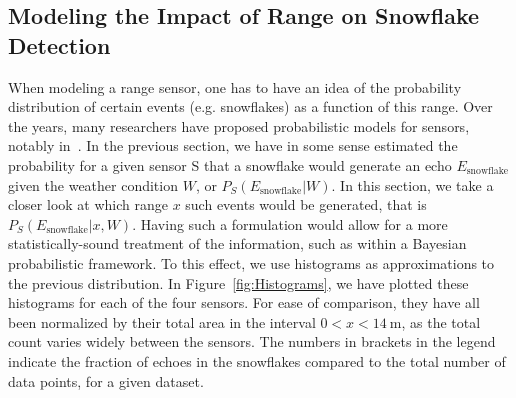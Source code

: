\subsection{Modeling the Impact of Range on Snowflake Detection}
When modeling a range sensor, one has to have an idea of the probability distribution of certain events (e.g. snowflakes) as a function of this range. Over the years, many researchers have proposed probabilistic models for sensors, notably in~\cite{Thrun:2005:PR:1121596}. In the previous section, we have in some sense estimated the probability for a given sensor S that a snowflake would generate an echo $E_\text{snowflake}$ given the weather condition $W$, or $P_S(E_\text{snowflake}|W)$. In this section, we take a closer look at which range $x$ such events would be generated, that is $P_S(E_\text{snowflake}|x,W)$. Having such a formulation would allow for a more statistically-sound treatment of the information, such as within a Bayesian probabilistic framework. To this effect, we use histograms as approximations to the previous distribution. In Figure~\ref{fig:Histograms}, we have plotted these histograms for each of the four sensors. For ease of comparison, they have all been normalized by their total area in the interval $0 < x < \SI{14}{\meter}$, as the total count varies widely between the sensors. The numbers in brackets in the legend indicate the fraction of echoes in the snowflakes compared to the total number of data points, for a given dataset.


